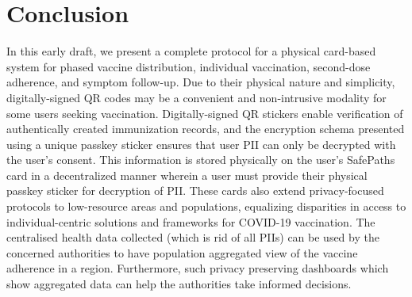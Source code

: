 \section{Conclusion}
In this early draft, we present a complete protocol for a physical card-based system for phased vaccine distribution, individual vaccination, second-dose adherence, and symptom follow-up. Due to their physical nature and simplicity, digitally-signed QR codes may be a convenient and non-intrusive modality for some users seeking vaccination. Digitally-signed QR stickers enable verification of authentically created immunization records, and the encryption schema presented using a unique passkey sticker ensures that user PII can only be decrypted with the user’s consent. This information is stored physically on the user’s SafePaths card in a decentralized manner wherein a user must provide their physical passkey sticker for decryption of PII. These cards also extend privacy-focused protocols to low-resource areas and populations, equalizing disparities in access to individual-centric solutions and frameworks for COVID-19 vaccination. The centralised health data collected (which is rid of all PIIs) can be used by the concerned authorities to have population aggregated view of the vaccine adherence in a region. Furthermore, such privacy preserving dashboards which show aggregated data can help the authorities take informed decisions.
